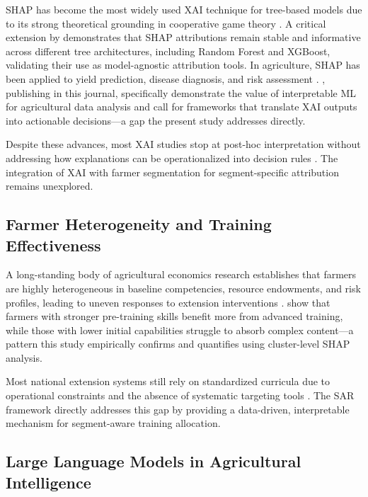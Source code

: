 \documentclass[3p,twocolumn,authoryear]{elsarticle}
\begin{document}
SHAP has become the most widely used XAI technique for tree-based models
due to its strong theoretical grounding in cooperative game theory
\citep{lundberg2017}.
A critical extension by \citet{lundberg2020} demonstrates that SHAP
attributions remain stable and informative across different tree
architectures, including Random Forest and XGBoost, validating their use
as model-agnostic attribution tools.
In agriculture, SHAP has been applied to yield prediction, disease
diagnosis, and risk assessment \citep{ghosal2018,ryo2022}.
\citet{ryo2022}, publishing in this journal, specifically demonstrate the
value of interpretable ML for agricultural data analysis and call for
frameworks that translate XAI outputs into actionable decisions---a gap
the present study addresses directly.

Despite these advances, most XAI studies stop at post-hoc interpretation
without addressing how explanations can be operationalized into decision
rules \citep{linardatos2021,arrieta2020}.
The integration of XAI with farmer segmentation for segment-specific
attribution remains unexplored.

\subsection{Farmer Heterogeneity and Training Effectiveness}

A long-standing body of agricultural economics research establishes that
farmers are highly heterogeneous in baseline competencies, resource
endowments, and risk profiles, leading to uneven responses to extension
interventions \citep{feder1985,anderson2004}.
\citet{davis2012} show that farmers with stronger pre-training skills
benefit more from advanced training, while those with lower initial
capabilities struggle to absorb complex content---a pattern this study
empirically confirms and quantifies using cluster-level SHAP analysis.

Most national extension systems still rely on standardized curricula due
to operational constraints and the absence of systematic targeting tools
\citep{anderson2004}.
The SAR framework directly addresses this gap by providing a
data-driven, interpretable mechanism for segment-aware training
allocation.

\subsection{Large Language Models in Agricultural Intelligence}
\end{document}
